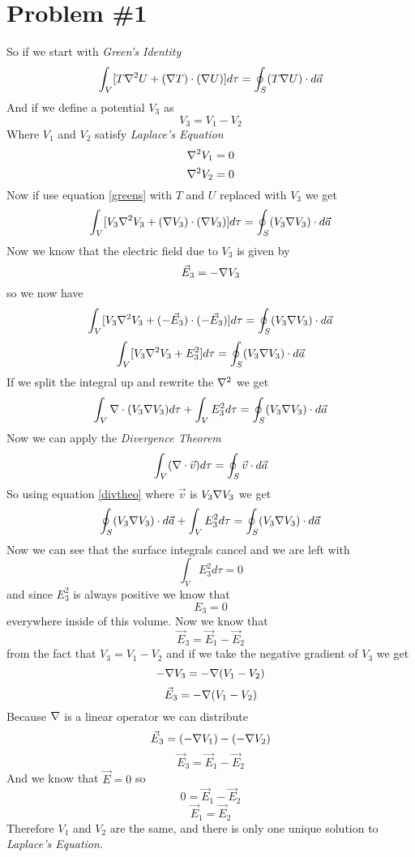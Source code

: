 \documentclass[11pt]{article}
\numberwithin{equation}{section}
\newcommand{\grad}{\bold\nabla}
\newcommand{\vecE}{\vec{E}}
\begin{document}


\section{Problem \#1}
So if we start with \emph{Green's Identity}
\begin{equation}
\int_V[T\grad^2 U + (\grad T)\cdot(\grad U)]d\tau= \oint_S (T\grad U)\cdot d\vec{a}
\label{greens}
\end{equation}
And if we define a potential $V_3$ as
$$V_3 = V_1-V_2$$
Where $V_1$ and $V_2$ satisfy \emph{Laplace's Equation}
$$\grad^2 V_1 = 0$$
$$\grad^2 V_2 = 0$$
Now if use equation \ref{greens} with $T$ and $U$ replaced with $V_3$ we get
$$\int_V[V_3\grad^2 V_3 + (\grad V_3)\cdot(\grad V_3)]d\tau= \oint_S (V_3\grad V_3)\cdot d\vec{a}$$
Now we know that the electric field due to $V_3$ is given by $$\vecE_3 = -\grad V_3$$
so we now have
$$\int_V[V_3\grad^2 V_3 + (-\vecE_3)\cdot(-\vecE_3)]d\tau= \oint_S (V_3\grad V_3)\cdot d\vec{a}$$
$$\int_V[V_3\grad^2 V_3 + E_3^2]d\tau= \oint_S (V_3\grad V_3)\cdot d\vec{a}$$
If we split the integral up and rewrite the $\grad^2$ we get
$$\int_V \grad\cdot (V_3\grad V_3)d\tau + \int_VE_3^2d\tau= \oint_S (V_3\grad V_3)\cdot d\vec{a}$$
Now we can apply the \emph{Divergence Theorem}
\begin{equation}
\int_V (\grad\cdot\vec{v})d\tau = \oint_S \vec{v}\cdot d\vec{a}
\label{divtheo}
\end{equation}
So using equation \ref{divtheo} where $\vec{v}$ is $V_3\grad V_3$ we get 
$$\oint_S(V_3\grad V_3)\cdot d\vec{a} + \int_VE_3^2d\tau= \oint_S (V_3\grad V_3)\cdot d\vec{a}$$
Now we can see that the surface integrals cancel and we are left with 
$$\int_VE_3^2d\tau= 0$$
and since $E_3^2$ is always positive we know that 
$$E_3 = 0$$
everywhere inside of this volume. Now we know that 
$$\vecE_3 = \vecE_1-\vecE_2$$
from the fact that $V_3= V_1-V_2$ and if we take the negative gradient of $V_3$ we get
$$-\grad V_3 = -\grad(V_1-V_2)$$
$$ \vecE_3 = -\grad(V_1-V_2)$$
Because $\grad$ is a linear operator we can distribute
$$ \vecE_3 = (-\grad V_1) - (-\grad V_2)$$
$$ \vecE_3 = \vecE_1-\vecE_2$$
And we know that $\vecE=0$ so
$$0 = \vecE_1-\vecE_2$$
$$ \vecE_1=\vecE_2$$
Therefore $V_1$ and $V_2$ are the same, and there is only one unique solution to \emph{Laplace's Equation}.
\end{document}
